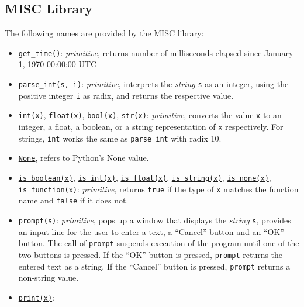 \subsection*{MISC Library}

The following
names are provided by the MISC library:
\begin{itemize}
  \item
    \href{https://sourceacademy.org/sicpjs/1.2.6\#ex_1.22}{\lstinline{get_time()}}:
    \textit{primitive}, returns number of milliseconds elapsed since
    January 1, 1970 00:00:00 UTC
  \item \verb#parse_int#\texttt{(s, i)}: \textit{primitive},
    interprets the \emph{string} \texttt{s} as an integer, using the
    positive integer \texttt{i} as radix, and returns the respective value.
  \item \verb#int#\texttt{(x)}, \verb#float#\texttt{(x)},
    \verb#bool#\texttt{(x)}, \verb#str#\texttt{(x)}: \textit{primitive},
    converts the value \texttt{x} to an integer, a float, a boolean, or a string
    representation of \texttt{x} respectively. For strings,
    \verb#int# works the same as
    \verb#parse_int# with radix 10.
  \item
    \href{https://sourceacademy.org/sicpjs/2.4.3\#p6}{\texttt{None}},
    refers to Python's None value.
  \item
    \href{https://sourceacademy.org/sicpjs/4.1.2\#p2}{\lstinline{is_boolean(x)}},
    \href{https://sourceacademy.org/sicpjs/2.3.2\#p5}{\lstinline{is_int(x)}},
    \href{https://sourceacademy.org/sicpjs/2.3.2\#p5}{\lstinline{is_float(x)}},
    \href{https://sourceacademy.org/sicpjs/2.3.2\#p7}{\lstinline{is_string(x)}},
    \href{https://sourceacademy.org/sicpjs/4.1.2\#p2}{\lstinline{is_none(x)}},
    \verb#is_function#\texttt{(x)}: \textit{primitive}, returns
    \texttt{true} if the type of \texttt{x} matches the function name
    and \texttt{false} if it does not.
  \item \texttt{prompt(s)}: \textit{primitive}, pops up a window that
    displays the \emph{string} \texttt{s}, provides
    an input line for the user to enter a text, a ``Cancel'' button
    and an ``OK'' button. The call of \texttt{prompt}
    suspends execution of the program until one of the two buttons is
    pressed. If
    the ``OK'' button is pressed, \texttt{prompt} returns the entered
    text as a string.
    If the ``Cancel'' button is pressed, \texttt{prompt} returns a
    non-string value.
  \item
    \href{https://sourceacademy.org/sicpjs/1.2.6\#footnote-7}{\texttt{print(x)}}:

\end{itemize}
